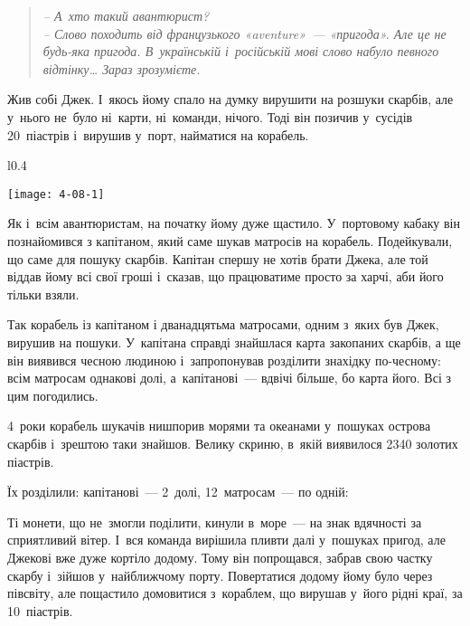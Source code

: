 \problem
{}

\begin{quote}
\itshape
    -- А~хто такий авантюрист? \\
    -- Слово походить від французького «aventure»~--- «пригода».
    Але це не будь-яка пригода.
    В~українській і~російській мові слово набуло певного відтінку\ldots
    Зараз зрозумієте.
\end{quote}

Жив собі Джек. І~якось йому спало на думку вирушити на розшуки скарбів,
але у~нього не~було ні~карти, ні~команди, нічого. Тоді він позичив
у~сусідів 20~піастрів і~вирушив у~порт, найматися на корабель.

\begin{wrapfigure}{l}{0.4\textwidth}
    \begin{center}
        \texttt{[image: 4-08-1]}
    \end{center}
\end{wrapfigure}

Як і~всім авантюристам, на початку йому дуже щастило.
У~портовому кабаку він познайомився з капітаном, який саме шукав
матросів на корабель. Подейкували, що саме для пошуку скарбів.
Капітан спершу не хотів брати Джека, але той віддав йому всі свої
гроші і~сказав, що працюватиме просто за харчі, аби його тільки взяли.

Так корабель із капітаном і дванадцятьма матросами, одним з~яких був Джек,
вирушив на пошуки. У~капітана справді знайшлася карта закопаних скарбів,
а ще він виявився чесною людиною і~запропонував розділити знахідку по-чесному:
всім матросам однакові долі, а~капітанові~--- вдвічі більше, бо карта його.
Всі з цим погодились.

4~роки корабель шукачів нишпорив морями та океанами у~пошуках острова
скарбів і~зрештою таки знайшов. Велику скриню, в~якій виявилося
2340 золотих піастрів.

Їх розділили: капітанові~--- 2~долі, 12~матросам~--- по одній:

Ті монети, що не~змогли поділити, кинули в~море~--- на знак вдячності
за сприятливий вітер. І~вся команда вирішила пливти далі у~пошуках пригод,
але Джекові вже дуже кортіло додому. Тому він попрощався, забрав свою
частку скарбу і~зійшов у~найближчому порту. Повертатися додому йому було
через півсвіту, але пощастило домовитися з~кораблем, що вирушав у~його
рідні краї, за 10~піастрів.

